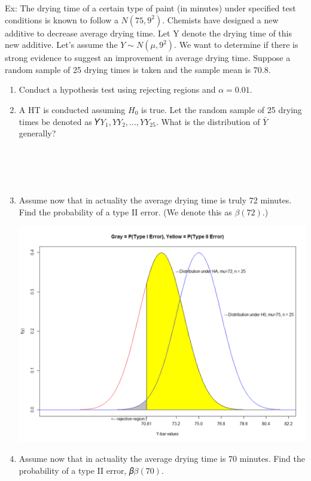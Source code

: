 Ex:  The drying time of a certain type of paint (in minutes) under specified test conditions is known to follow a $N(75,9^2)$. Chemists have designed a new additive to decrease average drying time. Let Y denote the drying time of this new additive. Let’s assume the $Y\sim N(\mu,9^2)$. We want to determine if there is strong evidence to suggest an improvement in average drying time. Suppose a random sample of 25 drying times is taken and the sample mean is 70.8.
\begin{enumerate}
\item Conduct a hypothesis test using rejecting regions and $\alpha = 0.01$.

\newpage

\item A HT is conducted assuming $H_0$ is true.  Let the random sample of 25 drying times be denoted as 𝑌$Y_1,𝑌Y_2,...,𝑌Y_{25}$. What is the distribution of $\bar{Y}$ generally? \\~\\~\\~\\~\\
\item Assume now that in actuality the average drying time is truly 72 minutes. Find the probability of a type II error. (We denote this as $\beta(72)$.) 
\begin{flushleft}
\includegraphics[scale=0.3]{mu72n25}
\end{flushleft}
\item Assume now that in actuality the average drying time is 70 minutes. Find the probability of a type II error, 𝛽$\beta(70)$.

\end{enumerate}

